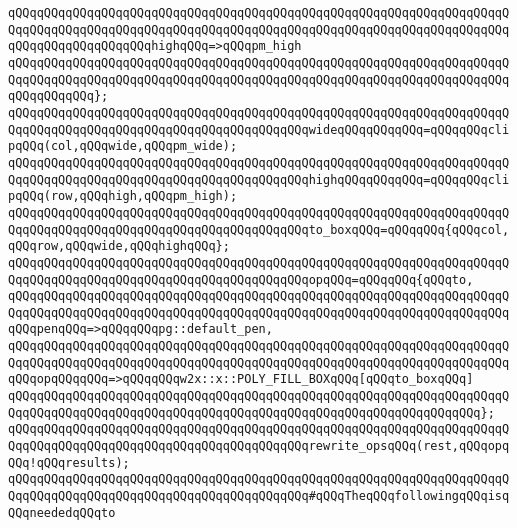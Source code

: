 \verb|qQQqqQQqqQQqqQQqqQQqqQQqqQQqqQQqqQQqqQQqqQQqqQQqqQQqqQQqqQQqqQQqqQQqqQQqqQQqqQQqqQQqqQQqqQQqqQQqqQQqqQQqqQQqqQQqqQQqqQQqqQQqqQQqqQQqqQQqqQQqqQQqqQQqqQQqqQQqqQQqhighqQQq=>qQQqpm_high|\newline
\verb|qQQqqQQqqQQqqQQqqQQqqQQqqQQqqQQqqQQqqQQqqQQqqQQqqQQqqQQqqQQqqQQqqQQqqQQqqQQqqQQqqQQqqQQqqQQqqQQqqQQqqQQqqQQqqQQqqQQqqQQqqQQqqQQqqQQqqQQqqQQqqQQqqQQqqQQq};|\newline
\newline
\verb|qQQqqQQqqQQqqQQqqQQqqQQqqQQqqQQqqQQqqQQqqQQqqQQqqQQqqQQqqQQqqQQqqQQqqQQqqQQqqQQqqQQqqQQqqQQqqQQqqQQqqQQqqQQqqQQqwideqQQqqQQqqQQq=qQQqqQQqclipqQQq(col,qQQqwide,qQQqpm_wide);|\newline
\verb|qQQqqQQqqQQqqQQqqQQqqQQqqQQqqQQqqQQqqQQqqQQqqQQqqQQqqQQqqQQqqQQqqQQqqQQqqQQqqQQqqQQqqQQqqQQqqQQqqQQqqQQqqQQqqQQqhighqQQqqQQqqQQq=qQQqqQQqclipqQQq(row,qQQqhigh,qQQqpm_high);|\newline
\newline
\verb|qQQqqQQqqQQqqQQqqQQqqQQqqQQqqQQqqQQqqQQqqQQqqQQqqQQqqQQqqQQqqQQqqQQqqQQqqQQqqQQqqQQqqQQqqQQqqQQqqQQqqQQqqQQqqQQqto_boxqQQq=qQQqqQQq{qQQqcol,qQQqrow,qQQqwide,qQQqhighqQQq};|\newline
\newline
\verb|qQQqqQQqqQQqqQQqqQQqqQQqqQQqqQQqqQQqqQQqqQQqqQQqqQQqqQQqqQQqqQQqqQQqqQQqqQQqqQQqqQQqqQQqqQQqqQQqqQQqqQQqqQQqqQQqopqQQq=qQQqqQQq{qQQqto,|\newline
\verb|qQQqqQQqqQQqqQQqqQQqqQQqqQQqqQQqqQQqqQQqqQQqqQQqqQQqqQQqqQQqqQQqqQQqqQQqqQQqqQQqqQQqqQQqqQQqqQQqqQQqqQQqqQQqqQQqqQQqqQQqqQQqqQQqqQQqqQQqqQQqqQQqpenqQQq=>qQQqqQQqpg::default_pen,|\newline
\verb|qQQqqQQqqQQqqQQqqQQqqQQqqQQqqQQqqQQqqQQqqQQqqQQqqQQqqQQqqQQqqQQqqQQqqQQqqQQqqQQqqQQqqQQqqQQqqQQqqQQqqQQqqQQqqQQqqQQqqQQqqQQqqQQqqQQqqQQqqQQqqQQqopqQQqqQQq=>qQQqqQQqw2x::x::POLY_FILL_BOXqQQq[qQQqto_boxqQQq]|\newline
\verb|qQQqqQQqqQQqqQQqqQQqqQQqqQQqqQQqqQQqqQQqqQQqqQQqqQQqqQQqqQQqqQQqqQQqqQQqqQQqqQQqqQQqqQQqqQQqqQQqqQQqqQQqqQQqqQQqqQQqqQQqqQQqqQQqqQQqqQQq};|\newline
\newline
\verb|qQQqqQQqqQQqqQQqqQQqqQQqqQQqqQQqqQQqqQQqqQQqqQQqqQQqqQQqqQQqqQQqqQQqqQQqqQQqqQQqqQQqqQQqqQQqqQQqqQQqqQQqqQQqqQQqrewrite_opsqQQq(rest,qQQqopqQQq!qQQqresults);|\newline
\newline
\newline
\verb|qQQqqQQqqQQqqQQqqQQqqQQqqQQqqQQqqQQqqQQqqQQqqQQqqQQqqQQqqQQqqQQqqQQqqQQqqQQqqQQqqQQqqQQqqQQqqQQqqQQqqQQqqQQqqQQq#qQQqTheqQQqfollowingqQQqisqQQqneededqQQqto|\newline
